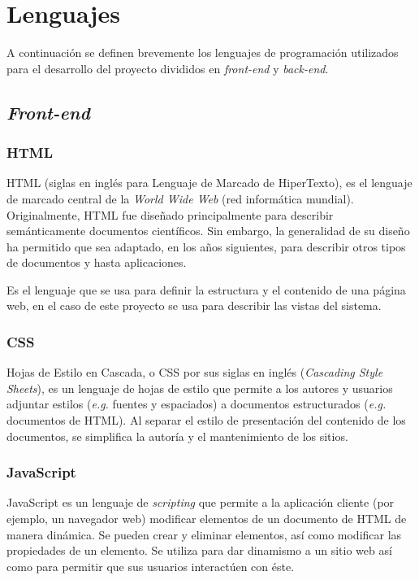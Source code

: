 \section{Lenguajes}
A continuación se definen brevemente los lenguajes de programación utilizados para el desarrollo del proyecto divididos en \textit{front-end} y \textit{back-end}.

\subsection{\emph{Front-end}}
\subsubsection{HTML}
HTML \cite{htmlW3C} (siglas en inglés para Lenguaje de Marcado de HiperTexto), es el lenguaje de marcado central de la \textit{World Wide Web} (red informática mundial). Originalmente, HTML fue diseñado principalmente para describir semánticamente documentos científicos. Sin embargo, la generalidad de su diseño ha permitido que sea adaptado, en los años siguientes, para describir otros tipos de documentos y hasta aplicaciones.

Es el lenguaje que se usa para definir la estructura y el contenido de una página web, en el caso de este proyecto se usa para describir las vistas del sistema.

\subsubsection{CSS}
Hojas de Estilo en Cascada, o CSS \cite{cssW3C} por sus siglas en inglés (\textit{Cascading Style Sheets}), es un lenguaje de hojas de estilo que permite a los autores y usuarios adjuntar estilos (\textit{e.g.} fuentes y espaciados) a documentos estructurados (\textit{e.g.} documentos de HTML). Al separar el estilo de presentación del contenido de los documentos, se simplifica la autoría y el mantenimiento de los sitios.

\subsubsection{JavaScript}
JavaScript \cite{jsMozilla} es un lenguaje de \textit{scripting} que permite a la aplicación cliente (por ejemplo, un navegador web) modificar elementos de un documento de HTML de manera dinámica. Se pueden crear y eliminar elementos, así como modificar las propiedades de un elemento. Se utiliza para dar dinamismo a un sitio web así como para permitir que sus usuarios interactúen con éste.

